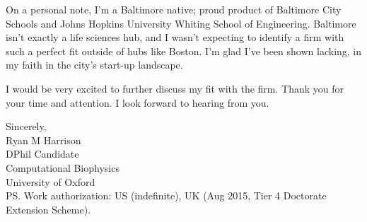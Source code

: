 \documentclass{../res}
\begin{document}
\begin{sloppypar}
\begin{resume}
On a personal note, I'm a Baltimore native; proud product of Baltimore City Schools and Johns Hopkins University Whiting School of Engineering. Baltimore isn't exactly a life sciences hub, and I wasn't expecting to identify a firm with such a perfect fit outside of hubs like Boston. I'm glad I've been shown lacking, in my faith in the city's start-up landscape.

I would be very excited to further discuss my fit with the firm. Thank you for your time and attention. I look forward to hearing from you.

Sincerely, \\
Ryan M Harrison \\ 
DPhil Candidate \\
Computational Biophysics \\
University of Oxford  \\
PS. Work authorization: US (indefinite), UK (Aug 2015, Tier 4 Doctorate Extension Scheme).
\end{resume} 
\end{sloppypar}
\end{document}
